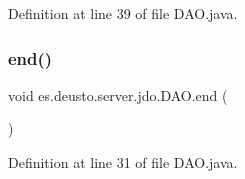 Definition at line 39 of file D\+A\+O.\+java.

\mbox{\label{classes_1_1deusto_1_1server_1_1jdo_1_1_d_a_o_a376574d8ad006d0bad98e39172b67847}} 
\subsubsection{\texorpdfstring{end()}{end()}}
{\footnotesize\ttfamily void es.\+deusto.\+server.\+jdo.\+D\+A\+O.\+end (\begin{DoxyParamCaption}{ }\end{DoxyParamCaption})}



Definition at line 31 of file D\+A\+O.\+java.

